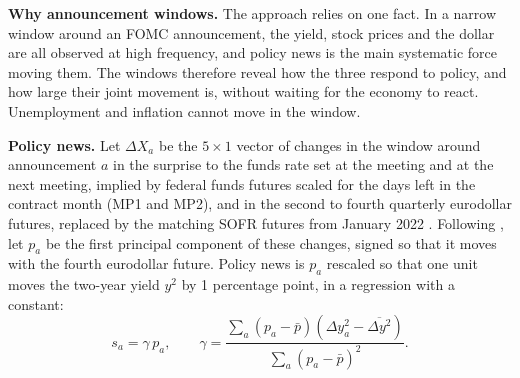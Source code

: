 \documentclass[11pt]{article}
\begin{document}
\textbf{Why announcement windows.} The approach relies on one fact. In a narrow window around an FOMC announcement, the yield, stock prices and the dollar are all observed at high frequency, and policy news is the main systematic force moving them. The windows therefore reveal how the three respond to policy, and how large their joint movement is, without waiting for the economy to react. Unemployment and inflation cannot move in the window.

\textbf{Policy news.} Let $\Delta X_a$ be the $5\times 1$ vector of changes in the window around announcement $a$ in the surprise to the funds rate set at the meeting and at the next meeting, implied by federal funds futures scaled for the days left in the contract month (MP1 and MP2), and in the second to fourth quarterly eurodollar futures, replaced by the matching SOFR futures from January 2022 \citep{acosta2025}. Following \citet{nakamura2018}, let $p_a$ be the first principal component of these changes, signed so that it moves with the fourth eurodollar future. Policy news is $p_a$ rescaled so that one unit moves the two-year yield $y^{2}$ by 1 percentage point, in a regression with a constant:
\begin{equation}
s_a = \gamma\, p_a, \qquad \gamma = \frac{\sum_a (p_a-\bar p)(\Delta y^{2}_a-\overline{\Delta y^{2}})}{\sum_a (p_a-\bar p)^{2}}. \label{eq:ns}
\end{equation}
\end{document}
